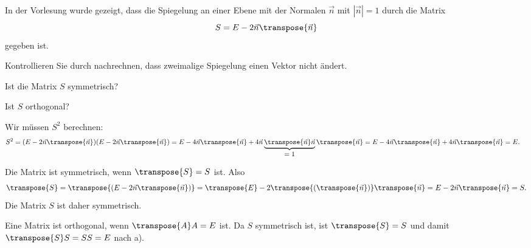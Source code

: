 In der Vorlesung wurde gezeigt, dass die Spiegelung an einer Ebene
mit der Normalen $\vec n$ mit $|\vec n|=1$ durch die Matrix
\[
S=E-2\vec n \transpose{\vec{n}}
\]
gegeben ist.
\begin{teilaufgaben}
\item Kontrollieren Sie durch nachrechnen, dass zweimalige Spiegelung einen
Vektor nicht ändert.
\item Ist die Matrix $S$ symmetrisch?
\item Ist $S$ orthogonal?
\end{teilaufgaben}


\begin{loesung}
\begin{teilaufgaben}
\item
Wir müssen $S^2$ berechnen:
\begin{align*}
S^2
&=
(E-2\vec{n}\transpose{\vec{n}}) (E-2\vec{n}\transpose{\vec{n}})
=
E
-
4\vec{n}\transpose{\vec{n}}
+
4\vec{n}\underbrace{\transpose{\vec{n}}\vec{n}}_{\displaystyle=1}
\transpose{\vec{n}}
=
E-4\vec{n}\transpose{\vec{n}} +4\vec{n} \transpose{\vec{n}}
=
E.
\end{align*}
\item
Die Matrix ist symmetrisch, wenn $\transpose{S}=S$ ist.
Also
\[
\transpose{S}
=
\transpose{(E-2\vec{n}\transpose{\vec{n}})}
=
\transpose{E} - 2\transpose{(\transpose{\vec{n}})} \transpose{\vec{n}}
=
E-2\vec{n}\transpose{\vec{n}}
=
S.
\]
Die Matrix $S$ ist daher symmetrisch.
\item
Eine Matrix ist orthogonal, wenn $\transpose{A}A=E$ ist.
Da $S$ symmetrisch ist, ist $\transpose{S}=S$ und damit
$\transpose{S}S=SS=E$ nach a).
\end{teilaufgaben}
\end{loesung}

